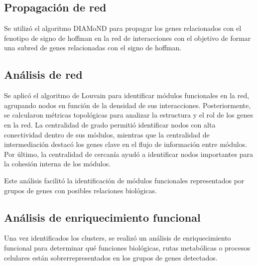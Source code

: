 \subsection{Propagación de red}

Se utilizó el algoritmo DIAMoND para propagar los genes relacionados con el fenotipo de signo de hoffman en la red de interacciones con el objetivo de formar una subred de genes relacionadas con el signo de hoffman.

\subsection{Análisis de red}
Se aplicó el algoritmo de Louvain para identificar módulos funcionales en la red, agrupando nodos en función de la densidad de sus interacciones. Posteriormente, se calcularon métricas topológicas para analizar la estructura y el rol de los genes en la red. La centralidad de grado permitió identificar nodos con alta conectividad dentro de sus módulos, mientras que la centralidad de intermediación destacó los genes clave en el flujo de información entre módulos. Por último, la centralidad de cercanía ayudó a identificar nodos importantes para la cohesión interna de los módulos.

Este análisis facilitó la identificación de módulos funcionales representados por grupos de genes con posibles relaciones biológicas.

\subsection{Análisis de enriquecimiento funcional}

Una vez identificados los clusters, se realizó un análisis de enriquecimiento funcional para determinar qué funciones biológicas, rutas metabólicas o procesos celulares están sobrerrepresentados en los grupos de genes detectados.